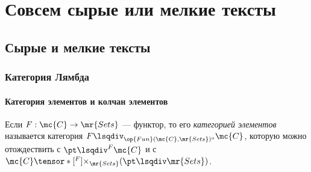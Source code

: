 \documentclass[
	extrafontsizes,
	11pt,
	hyphens,
]{memoir}
\begin{document}
%




\part{Совсем сырые или мелкие тексты}



\chapter{Сырые и мелкие тексты}


\section{Категория Лямбда}

\subsection{Категория элементов и колчан элементов}

\begin{definition}
Если \(F : \mc{C} \to \mr{Sets}\) --- функтор, то его \emph{категорией элементов} называется категория
\(F \lsqdiv_{\op{Fun}(\mc{C},\mr{Sets})^o} \mc{C}\),
которую можно отождествить с
\(\pt \lsqdiv^F \mc{C}\) и с \(\mc{C} \tensor*[^F]{\times}{_{\mr{Sets}}} (\pt \lsqdiv \mr{Sets})\).
\end{definition}

\end{document}
